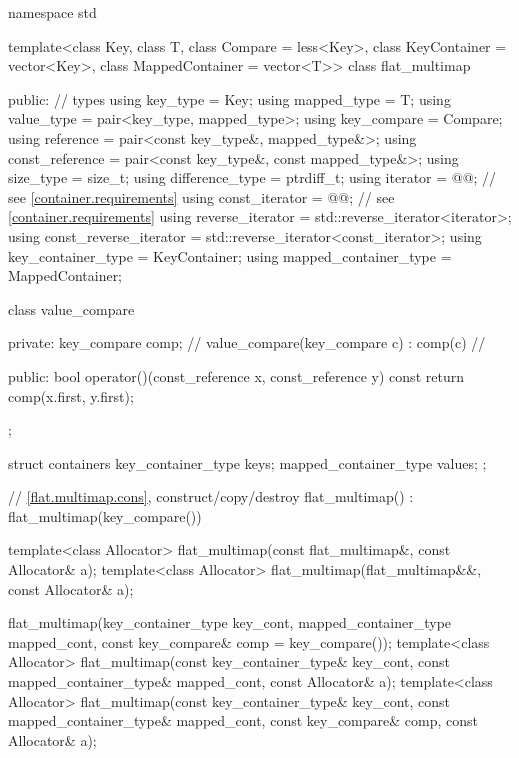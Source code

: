 \begin{codeblock}
namespace std {
  template<class Key, class T, class Compare = less<Key>,
           class KeyContainer = vector<Key>, class MappedContainer = vector<T>>
  class flat_multimap {
  public:
    // types
    using key_type               = Key;
    using mapped_type            = T;
    using value_type             = pair<key_type, mapped_type>;
    using key_compare            = Compare;
    using reference              = pair<const key_type&, mapped_type&>;
    using const_reference        = pair<const key_type&, const mapped_type&>;
    using size_type              = size_t;
    using difference_type        = ptrdiff_t;
    using iterator               = @@;     // see \ref{container.requirements}
    using const_iterator         = @@;     // see \ref{container.requirements}
    using reverse_iterator       = std::reverse_iterator<iterator>;
    using const_reverse_iterator = std::reverse_iterator<const_iterator>;
    using key_container_type     = KeyContainer;
    using mapped_container_type  = MappedContainer;

    class value_compare {
    private:
      key_compare comp;                                 // \expos
      value_compare(key_compare c) : comp(c) { }        // \expos

    public:
      bool operator()(const_reference x, const_reference y) const {
        return comp(x.first, y.first);
      }
    };

    struct containers {
      key_container_type keys;
      mapped_container_type values;
    };

    // \ref{flat.multimap.cons}, construct/copy/destroy
    flat_multimap() : flat_multimap(key_compare()) { }

    template<class Allocator>
      flat_multimap(const flat_multimap&, const Allocator& a);
    template<class Allocator>
      flat_multimap(flat_multimap&&, const Allocator& a);

    flat_multimap(key_container_type key_cont, mapped_container_type mapped_cont,
                  const key_compare& comp = key_compare());
    template<class Allocator>
      flat_multimap(const key_container_type& key_cont, const mapped_container_type& mapped_cont,
                    const Allocator& a);
    template<class Allocator>
      flat_multimap(const key_container_type& key_cont, const mapped_container_type& mapped_cont,
                    const key_compare& comp, const Allocator& a);

}}
\end{codeblock}
